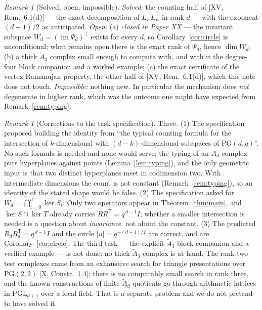 \documentclass[11pt]{amsart}
\numberwithin{equation}{section}
\theoremstyle{definition}
\theoremstyle{remark}
\newtheorem{remark}[theorem]{Remark}
\newcommand{\Atilde}[1]{\widetilde A_{#1}}
\newcommand{\LE}{L_{E}}
\newcommand{\PG}{\mathrm{PG}}
\begin{document}
\begin{remark}[Solved, open, impossible]\label{rem:soi}
\emph{Solved:} the counting half of [XV, Rem.~6.1(d)] --- the exact decomposition of
$\LE\LE^{\mathsf T}$ in rank $d$ --- with the exponent $(d-1)/2$ as anticipated.
\emph{Open:} (a) \emph{closed in Paper XX} --- the invariant subspace
$W_d=(\operatorname{im}\Psi_d)^{\perp}$ exists for every $d$, so
Corollary~\ref{cor:circle} is unconditional; what remains open there is the exact rank of
$\Psi_d$, hence $\dim W_d$;
(b) a thick $\Atilde3$ complex small enough to compute with, and with it the degree-four
block companion and a worked example; (c) the exact certificate of the vertex Ramanujan
property, the other half of [XV, Rem.~6.1(d)], which this note does not touch.
\emph{Impossible:} nothing new. In particular the mechanism does \emph{not} degenerate in
higher rank, which was the outcome one might have expected from
Remark~\ref{rem:typing}.
\end{remark}

\begin{remark}[Corrections to the task specification]\label{rem:corrections}
Three. (1) The specification proposed building the identity from ``the typical counting
formula for the intersection of $k$-dimensional with $(d-k)$-dimensional subspaces of
$\PG(d,q)$''. No such formula is needed and none would serve: the typing of an $\Atilde d$
complex puts hyperplanes against points (Lemma~\ref{lem:typing}), and the only geometric
input is that two distinct hyperplanes meet in codimension two. With intermediate
dimensions the count is not constant (Remark~\ref{rem:typing}), so an identity of the
stated shape would be false. (2) The specification asked for
$W_d=\bigcap_{i=0}^{d}\ker S_i$. Only two operators appear in Theorem~\ref{thm:main}, and
$\ker S\cap\ker T$ already carries $RR^{\mathsf T}=q^{\,d-1}I$; whether a smaller
intersection is needed is a question about \emph{invariance}, not about the constant.
(3) The predicted $R_dR_d^{\mathsf T}=q^{\,d-1}I$ and the circle $|u|=q^{-(d-1)/2}$ are
correct, and are Corollary~\ref{cor:circle}. The third task --- the explicit $\Atilde3$
block companion and a verified example --- is not done: no thick $\Atilde3$ complex is at
hand. The rank-two test complexes came from an exhaustive search for triangle
presentations over $\PG(2,2)$ [X, Constr.~1.4]; there is no comparably small search in
rank three, and the known constructions of finite $\Atilde d$ quotients go through
arithmetic lattices in $\mathrm{PGL}_{d+1}$ over a local field. That is a separate problem
and we do not pretend to have solved it.
\end{remark}
\end{document}

